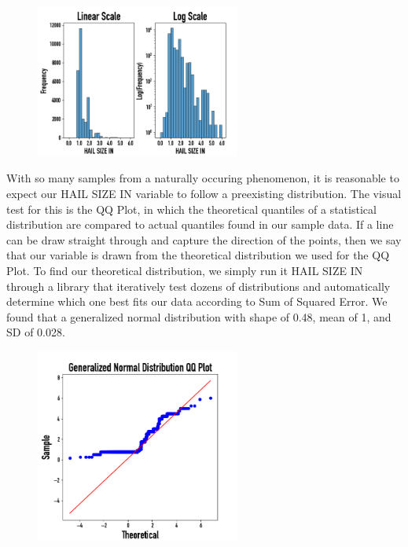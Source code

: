 \documentclass[fleqn,10pt]{SelfArx} %
\begin{document}
\begin{figure}[H]
\includegraphics[width=0.6\textwidth, center=8.5cm]{"plots/hail_hist.png"} 
\end{figure}

With so many samples from a naturally occuring phenomenon, it is reasonable to expect our HAIL SIZE IN variable to follow a preexisting distribution. The visual test for this is the QQ Plot, in which the theoretical quantiles of a statistical distribution are compared to actual quantiles found in our sample data. If a line can be draw straight through and capture the direction of the points, then we say that our variable is drawn from the theoretical distribution we used for the QQ Plot. To find our theoretical distribution, we simply run it HAIL SIZE IN through a library that iteratively test dozens of distributions and automatically determine which one best fits our data according to Sum of Squared Error. We found that a generalized normal distribution with shape of 0.48, mean of 1, and SD of 0.028.

\begin{figure}[H]
\includegraphics[width=0.6\textwidth, center=8.5cm]{"plots/qq_plot.png"} 
\end{figure}
\end{document}
